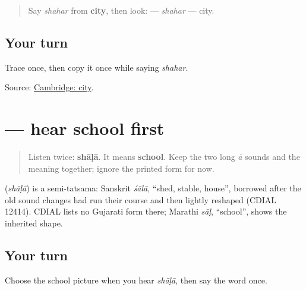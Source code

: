 \label{lesson:GU-C22-shahar}



\begin{quote}
Say \emph{shahar} from \textbf{city}, then look: \textbf{} — \emph{shahar} — city.
\end{quote}

\subsection*{Your turn}

Trace \textbf{} once, then copy it once while saying \emph{shahar}.

\begin{tcolorbox}[breakable,colback=teal!4,colframe=teal!35!black,title={Before you move on}]
Source: \href{https://dictionary.cambridge.org/dictionary/english-gujarati/city}{Cambridge: city}.
\end{tcolorbox}
\section[\texorpdfstring{\gu{શાળા} (shāḷā)}{શાળા (shāḷā)}]{ — hear school first}

\label{lesson:GU-C22-hear-shaalaa}



\begin{quote}
Listen twice: \textbf{shāḷā}. It means \textbf{school}. Keep the two long \emph{ā} sounds and the meaning together; ignore the printed form for now.
\end{quote}

\begin{cousinweb}
\textbf{} (\emph{shāḷā}) is a semi-tatsama: Sanskrit \emph{śālā}, \textquotedblleft{}shed, stable, house\textquotedblright{}, borrowed after the old sound changes had run their course and then lightly reshaped (CDIAL 12414). CDIAL lists no Gujarati form there; Marathi \emph{sāḷ}, \textquotedblleft{}school\textquotedblright{}, shows the inherited shape.
\end{cousinweb}

\subsection*{Your turn}
Choose the school picture when you hear \emph{shāḷā}, then say the word once.

